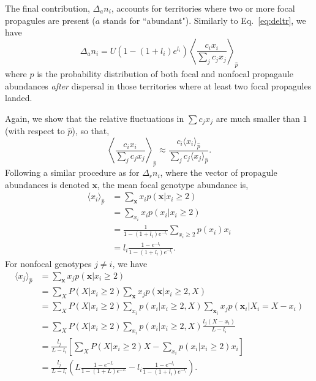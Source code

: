 \documentclass[11pt]{article}
\begin{document}
The final contribution, $\Delta_a n_i$, accounts for territories where two or more focal propagules are present ($a$ stands for ``abundant"). Similarly to Eq.~\eqref{eq:deltr}, we have 
\begin{equation}
\Delta_a n_i=U(1-(1+l_i)e^{l_i})\left\langle \frac{c_i x_i}{\sum_j c_j x_j} \right\rangle_{\hat{p}}\label{eq:delta}
\end{equation}
where $\hat{p}$ is the probability distribution of both focal and nonfocal propagaule abundances \textit{after} dispersal in those territories where at least two focal propagules landed. 

Again, we show that the relative fluctuations in $\sum c_j x_j$ are much smaller than $1$ (with respect to $\hat{p}$), so that,
\begin{equation}
\left\langle \frac{c_i x_i}{\sum_j c_j x_j} \right\rangle_{\hat{p}}\approx  \frac{c_i \langle x_i \rangle_{\hat{p}}}{\sum_j c_j \langle x_j\rangle_{\hat{p}}}.\label{eq:meanfielda}
\end{equation}
Following a similar procedure as for $\Delta_r n_i$, where the vector of propagule abundances is denoted ${\mathbf x}$, the mean focal genotype abundance is, 
\begin{align}
\langle x_i \rangle_{\hat{p}}&=\sum_{\mathbf x} x_i p(\mathbf x|x_i\geq 2)\nonumber \\
&=\sum_{x_i} x_i p(x_i|x_i\geq 2) \nonumber\\
&=\frac{1}{1-(1+l_i)e^{-l_i}}\sum_{x_i\geq 2} p(x_i)x_i\nonumber\\
&=l_i\frac{1-e^{-l_i}}{1-(1+l_i)e^{-l_i}}.
\end{align}
For nonfocal genotypes $j\neq i$, we have
\begin{align}
\langle x_j \rangle_{\hat{p}}&=\sum_{\mathbf x} x_j p(\mathbf x|x_i\geq 2)\nonumber \\
&=\sum_{X}P(X|x_i\geq 2)\sum_{\mathbf x} x_j p({\mathbf x}|x_i\geq 2,X)\nonumber\\
&=\sum_{X}P(X|x_i\geq 2)\sum_{x_i} p(x_i|x_i\geq 2,X) \sum_{\mathbf x_i} x_j p(\mathbf x_i|X_i=X-x_i)\nonumber\\
&=\sum_{X}P(X|x_i\geq 2)\sum_{x_i}p(x_i|x_i\geq 2,X) \frac{l_j(X-x_i)}{L-l_i} \nonumber\\
&=\frac{l_j}{L-l_i}\left[\sum_{X}P(X|x_i\geq 2)X - \sum_{x_i}p(x_i|x_i\geq 2) x_i \right]\nonumber\\
&=\frac{l_j}{L-l_i}\left( L\frac{1-e^{-L}}{1-(1+L)e^{-L}}- l_i\frac{1-e^{-l_i}}{1-(1+l_i)e^{-l_i}}\right). 
\end{align}
\end{document}
